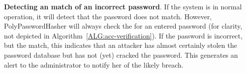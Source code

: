 {\bf Detecting an \partialbytes match of an incorrect password}.  If the
system is in normal operation, it will detect that the password does not match.
However, PolyPasswordHasher will always check the \partialbytes for an entered
password (for clarity, not depicted in Algorithm~\ref{ALG:acc-verification}).
If the password is incorrect, but the \partialbytes match, this indicates that
an attacker has almost certainly stolen the password database but has not (yet)
cracked the password.  This generates an alert to the administrator to notify
her of the likely breach.


